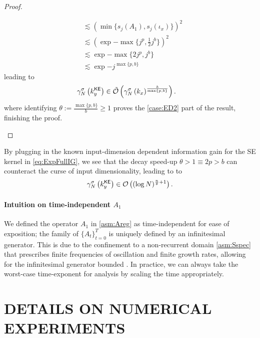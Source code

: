 \begin{theorem}
\begin{proof}
\begin{description}[style=multiline, leftmargin=3em,font=\normalfont]
\begin{align}
&  \lesssim \left(\min\{s_j(A_1),s_j(\iota_x)\}\right)^2 \\
&  \lesssim \left(\exp{-{\max\{j^p,\frac{1}{2}j^{{b}}\}}}\right)^2 \\
&  \lesssim \exp{-{\max\{2j^p,j^{{b}}\}}} \\
     & \lesssim  \exp{-j^{\max\{p,b\}}}
\end{align}
leading to
\begin{align}
    \gamma^{\sigma}_N\left(k^{{\textsf{KE}}}_{y}\right) &  \in \tilde{\mathcal{O}} \left(\gamma^{\sigma}_N\left(k_{x}\right)^\frac{b}{\max\{p,b\}}\right).
\end{align}
where identifying $\theta := \frac{\max\{p,b\}}{b} \geq 1$ proves the \ref{case:ED2} part of the result, finishing the proof.
\end{description}
\end{proof}
\end{theorem}


\begin{remark}
    By plugging in the known input-dimension dependent information gain for the SE kernel in \eqref{eq:ExpFullIG}, we see that the decay speed-up  $\theta > 1 \equiv 2p > b$ can counteract the curse of input dimensionality, leading to to 
    $$
    \gamma^{\sigma}_N\left(k^{{\textsf{KE}}}_{y}\right) \in {\mathcal{O}} \left((\log N)^{\frac{n}{\theta}+1}\right).
    $$
\end{remark}

\paragraph{Intuition on time-independent $A_1$} 
We defined the operator $A_1$ in \ref{asm:Areg} as time-independent for ease of exposition; the family of $\{A_t\}^T_{t=0}$ is uniquely defined by an infinitesimal generator.
This is due to the confinement to a non-recurrent domain \ref{asm:Sspec} that prescribes finite frequencies of oscillation and finite growth rates, allowing for the infinitesimal generator bounded \citep{Zeng2023AOperator}.
In practice, we can always take the worst-case time-exponent for analysis by scaling the time appropriately.












\section{DETAILS ON NUMERICAL EXPERIMENTS}\label{supl:NumExp}

